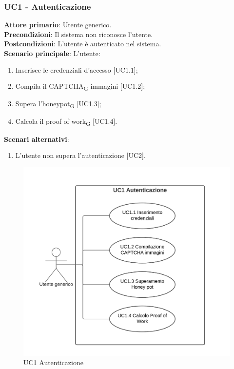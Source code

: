 \subsubsection{UC1 - Autenticazione}
\textbf{Attore primario}: Utente generico.\\
\textbf{Precondizioni}: Il sistema non riconosce l'utente.\\
\textbf{Postcondizioni}: L'utente è autenticato nel sistema.\\

\textbf{Scenario principale}: L'utente:
\begin{enumerate}
\item Inserisce le credenziali d'accesso [UC1.1];
\item Compila il CAPTCHA\textsubscript{G} immagini [UC1.2];
\item Supera l'honeypot\textsubscript{G} [UC1.3];
\item Calcola il proof of work\textsubscript{G} [UC1.4].
\end{enumerate}

\textbf{Scenari alternativi}:
\begin{enumerate}
    \item L’utente non supera l'autenticazione [UC2].
\end{enumerate}

\begin{figure}[H]
    \centering
    \includegraphics[scale=0.8]{img/Autenticazione.png}
    \caption{UC1 Autenticazione}
\end{figure}

